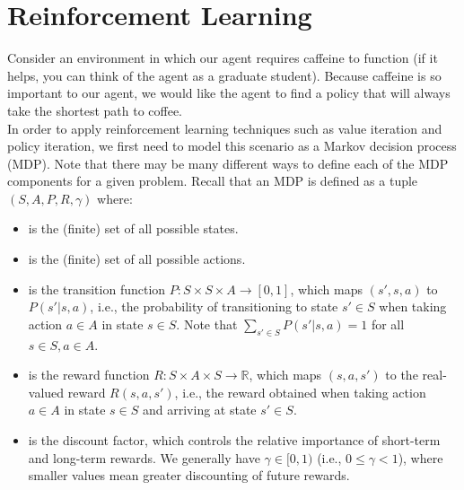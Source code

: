 \section{Reinforcement Learning } 

Consider an environment in which our agent requires caffeine to function (if it helps, you can think of the agent as a graduate student). Because caffeine is so important to our agent, we would like the agent to find a policy that will always take the shortest path to coffee. \\

In order to apply reinforcement learning techniques such as value iteration and policy iteration, we first need to model this scenario as a Markov decision process (MDP). Note that there may be many different ways to define each of the MDP components for a given problem. Recall that an MDP is defined as a tuple
$(S, A, P, R, \gamma)$ where:
\begin{itemize}
\item[$S$] is the (finite) set of all possible states.
\item[$A$] is the (finite) set of all possible actions.
\item[$P$] is the transition function $P: S \times S \times A \to [0, 1]$, 
  which maps $(s', s, a)$ to $P(s'|s, a)$, i.e., 
  the probability of transitioning to state $s'\in S$ when taking action
  $a\in A$ in state $s\in S$. 
  Note that $\sum _{s' \in S} P(s' | s, a) = 1$ for all 
  $s \in S, a \in A$.
\item[$R$] is the reward function $R : S \times A \times S \to \mathbb R$,
which maps $(s, a, s')$ to the real-valued reward $R(s, a, s')$, i.e., 
the reward obtained when taking action $a \in A$ in state $s \in S$ and 
arriving at state $s' \in S$.
\item[$\gamma$] is the discount factor, which controls the relative importance of short-term and long-term rewards. We generally have $\gamma \in [0, 1)$ (i.e., $0 \leq \gamma < 1$), where smaller values mean greater  discounting of future rewards.
\end{itemize}

